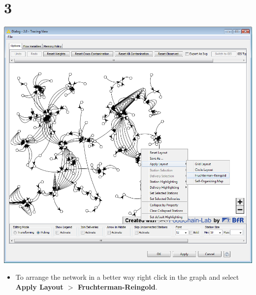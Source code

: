 \documentclass{beamer}
\begin{document}
\section{3}
\begin{frame}
	\begin{center}
  		\includegraphics[height=0.6\textheight]{3.png}
	\end{center}
	\begin{itemize}
		\item To arrange the network in a better way right click in the graph and select \textbf{Apply Layout $>$ Fruchterman-Reingold}.
	\end{itemize}
\end{frame}
\end{document}
